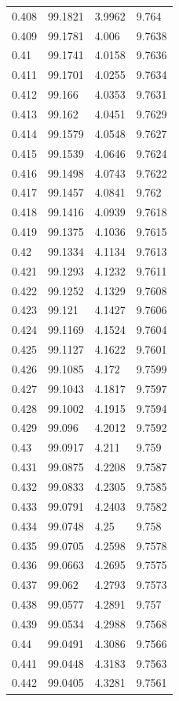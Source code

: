 \begin{tabular}{llll}
0.408 & 99.1821 & 3.9962 & 9.764 \\
0.409 & 99.1781 & 4.006 & 9.7638 \\
0.41 & 99.1741 & 4.0158 & 9.7636 \\
0.411 & 99.1701 & 4.0255 & 9.7634 \\
0.412 & 99.166 & 4.0353 & 9.7631 \\
0.413 & 99.162 & 4.0451 & 9.7629 \\
0.414 & 99.1579 & 4.0548 & 9.7627 \\
0.415 & 99.1539 & 4.0646 & 9.7624 \\
0.416 & 99.1498 & 4.0743 & 9.7622 \\
0.417 & 99.1457 & 4.0841 & 9.762 \\
0.418 & 99.1416 & 4.0939 & 9.7618 \\
0.419 & 99.1375 & 4.1036 & 9.7615 \\
0.42 & 99.1334 & 4.1134 & 9.7613 \\
0.421 & 99.1293 & 4.1232 & 9.7611 \\
0.422 & 99.1252 & 4.1329 & 9.7608 \\
0.423 & 99.121 & 4.1427 & 9.7606 \\
0.424 & 99.1169 & 4.1524 & 9.7604 \\
0.425 & 99.1127 & 4.1622 & 9.7601 \\
0.426 & 99.1085 & 4.172 & 9.7599 \\
0.427 & 99.1043 & 4.1817 & 9.7597 \\
0.428 & 99.1002 & 4.1915 & 9.7594 \\
0.429 & 99.096 & 4.2012 & 9.7592 \\
0.43 & 99.0917 & 4.211 & 9.759 \\
0.431 & 99.0875 & 4.2208 & 9.7587 \\
0.432 & 99.0833 & 4.2305 & 9.7585 \\
0.433 & 99.0791 & 4.2403 & 9.7582 \\
0.434 & 99.0748 & 4.25 & 9.758 \\
0.435 & 99.0705 & 4.2598 & 9.7578 \\
0.436 & 99.0663 & 4.2695 & 9.7575 \\
0.437 & 99.062 & 4.2793 & 9.7573 \\
0.438 & 99.0577 & 4.2891 & 9.757 \\
0.439 & 99.0534 & 4.2988 & 9.7568 \\
0.44 & 99.0491 & 4.3086 & 9.7566 \\
0.441 & 99.0448 & 4.3183 & 9.7563 \\
0.442 & 99.0405 & 4.3281 & 9.7561 \\

\end{tabular}
